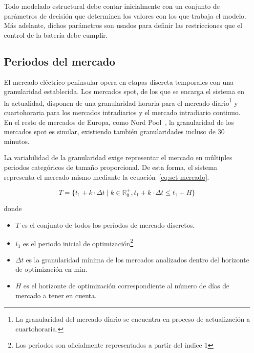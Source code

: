 Todo modelado estructural debe contar inicialmente con un conjunto de parámetros de decisión que determinen los valores con los que trabaja el modelo. Más adelante, dichos parámetros son usados para definir las restricciones que el control de la batería debe cumplir.

\subsection{Periodos del mercado}
\label{makereference5.1.1}

El mercado eléctrico peninsular opera en etapas discreta temporales con una granularidad establecida. Los mercados spot, de los que se encarga el sistema en la actualidad, disponen de una granularidad horaria para el mercado diario\footnote{La granularidad del mercado diario se encuentra en proceso de actualización a cuartohoraria.} y cuartohoraria para los mercados intradiarios y el mercado intradiario continuo. En el resto de mercados de Europa, como Nord Pool~\cite{nord2025leading}, la granularidad de los mercados spot es similar, existiendo también granularidades incluso de 30 minutos.

La variabilidad de la granularidad exige representar el mercado en múltiples periodos categóricos de tamaño proporcional. De esta forma, el sistema representa el mercado mismo mediante la ecuación~\ref{eq:set-mercado}.

\begin{samepage}

  \begin{equation}
    \label{eq:set-mercado}
    T = \{t_{1} + k \cdot \Delta t \mid k \in \mathbb{R}^{+}_{0}, t_{1} + k \cdot \Delta t \leq t_{1} + H\}
  \end{equation}

  donde

  \begin{itemize}

    \item \( T \) es el conjunto de todos los períodos de mercado discretos.

    \item \( t_{1} \) es el periodo inicial de optimización\footnote{Los periodos son oficialmente representados a partir del índice 1}.

    \item \( \Delta t \) es la granularidad mínima de los mercados analizados dentro del horizonte de optimización en \si{\minute}.

    \item \( H \) es el horizonte de optimización correspondiente al número de días de mercado a tener en cuenta.

  \end{itemize}

\end{samepage}

